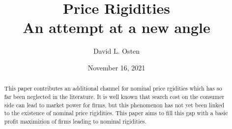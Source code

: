 \documentclass[ProjectDLO]{subfiles}
\begin{document}
\providecommand{\versn}{pdf} %
\ifthenelse{\boolean{Web}}{    %
  \renewcommand{\versn}{Web}     %
  \renewcommand{\rootFromOut}{.} %
}{}  %


\title{Price Rigidities \\ An attempt at a new angle}

\author{David L. Osten\authNum}



\renewcommand{\forcedate}{November 16, 2021}\date{\forcedate}

\maketitle
\hypertarget{abstract}{}
\begin{abstract}
This paper contributes an additional channel for nominal price rgidities which has so far been neglected in the literature. It is well known that search cost on the consumer side can lead to market power for firms, but this phenomenon has not yet been linked to the existence of nominal price rigidities. This paper aims to fill this gap with a basic profit maximizion of firms leading to nominal rigidities.
\end{abstract}


\hypertarget{links}{}
\end{document}
